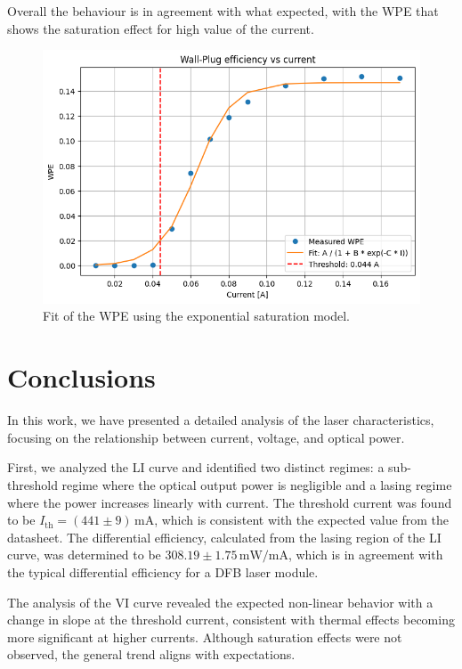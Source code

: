 \documentclass[prl,twocolumn]{revtex4-1}
\begin{document}
Overall the behaviour is in agreement with what expected, with the WPE that shows the saturation effect for high value of the current.

\begin{figure}[!t]
    \centering
    \includegraphics[width=\linewidth]{Images/wpe_fit.png}
    \caption{Fit of the WPE using the exponential saturation model.}
    \label{fig:wpe_fit}
\end{figure}



\section{Conclusions}

In this work, we have presented a detailed analysis of the laser characteristics, focusing on the relationship between current, voltage, and optical power.

First, we analyzed the LI curve and identified two distinct regimes: a sub-threshold regime where the optical output power is negligible and a lasing regime where the power increases linearly with current. The threshold current was found to be \(I_{\text{th}} = (441 \pm 9) \, \text{mA}\), which is consistent with the expected value from the datasheet. The differential efficiency, calculated from the lasing region of the LI curve, was determined to be \(308.19 \pm 1.75 \, \text{mW/mA}\), which is in agreement with the typical differential efficiency for a DFB laser module.

The analysis of the VI curve revealed the expected non-linear behavior with a change in slope at the threshold current, consistent with thermal effects becoming more significant at higher currents. Although saturation effects were not observed, the general trend aligns with expectations.
\end{document}
